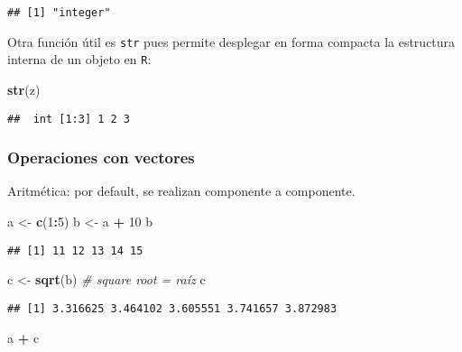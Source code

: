 \documentclass[]{article}
\newenvironment{Shaded}{\begin{snugshade}}{\end{snugshade}}
\newcommand{\KeywordTok}[1]{\textcolor[rgb]{0.13,0.29,0.53}{\textbf{#1}}}
\newcommand{\DecValTok}[1]{\textcolor[rgb]{0.00,0.00,0.81}{#1}}
\newcommand{\StringTok}[1]{\textcolor[rgb]{0.31,0.60,0.02}{#1}}
\newcommand{\CommentTok}[1]{\textcolor[rgb]{0.56,0.35,0.01}{\textit{#1}}}
\newcommand{\OperatorTok}[1]{\textcolor[rgb]{0.81,0.36,0.00}{\textbf{#1}}}
\newcommand{\NormalTok}[1]{#1}
\begin{document}
\begin{verbatim}
## [1] "integer"
\end{verbatim}

Otra función útil es \texttt{str} pues permite desplegar en forma
compacta la estructura interna de un objeto en \texttt{R}:

\begin{Shaded}
\begin{Highlighting}[]
\KeywordTok{str}\NormalTok{(z)}
\end{Highlighting}
\end{Shaded}

\begin{verbatim}
##  int [1:3] 1 2 3
\end{verbatim}

\subsubsection{Operaciones con vectores}\label{operaciones-con-vectores}

Aritmética: por default, se realizan componente a componente.

\begin{Shaded}
\begin{Highlighting}[]
\NormalTok{a <-}\StringTok{ }\KeywordTok{c}\NormalTok{(}\DecValTok{1}\OperatorTok{:}\DecValTok{5}\NormalTok{)}
\NormalTok{b <-}\StringTok{ }\NormalTok{a }\OperatorTok{+}\StringTok{ }\DecValTok{10}
\NormalTok{b}
\end{Highlighting}
\end{Shaded}

\begin{verbatim}
## [1] 11 12 13 14 15
\end{verbatim}

\begin{Shaded}
\begin{Highlighting}[]
\NormalTok{c <-}\StringTok{ }\KeywordTok{sqrt}\NormalTok{(b) }\CommentTok{# square root = raíz}
\NormalTok{c}
\end{Highlighting}
\end{Shaded}

\begin{verbatim}
## [1] 3.316625 3.464102 3.605551 3.741657 3.872983
\end{verbatim}

\begin{Shaded}
\begin{Highlighting}[]
\NormalTok{a }\OperatorTok{+}\StringTok{ }\NormalTok{c}
\end{Highlighting}
\end{Shaded}
\end{document}
